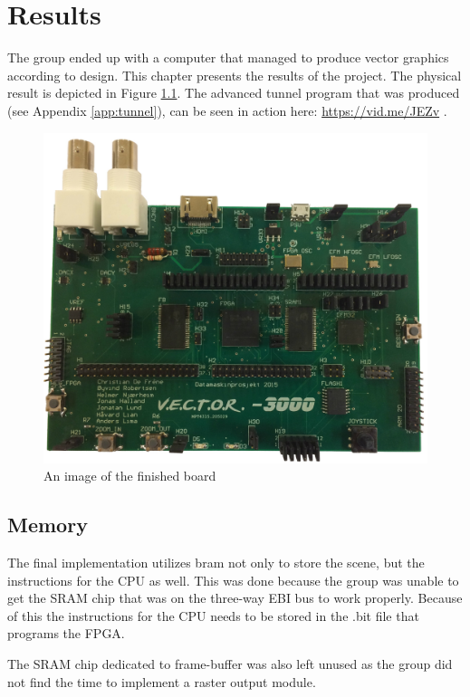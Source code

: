 \chapter{Results}
The group ended up with a computer that managed to produce vector graphics according to design.
This chapter presents the results of the project.
The physical result is depicted in Figure \ref{fig:board-top}.
The advanced tunnel program that was produced (see Appendix \ref{app:tunnel}), can be seen in action here: \href{https://vid.me/JEZv}{https://vid.me/JEZv} \cite{tunnel-demo}.

\begin{figure}[h!]
	    \includegraphics[width=\linewidth]{images/board_top.jpg}
	    \caption{An image of the finished \vthreek board}
	    \label{fig:board-top}
\end{figure}

\section{Memory}

The final implementation utilizes \gls{bram} not only to store the scene, but the instructions for the CPU as well.
This was done because the group was unable to get the SRAM chip that was on the three-way EBI bus to work properly.
Because of this the instructions for the CPU needs to be stored in the .bit file that programs the FPGA.

The SRAM chip dedicated to frame-buffer was also left unused as the group did not find the time to implement a raster output module.

